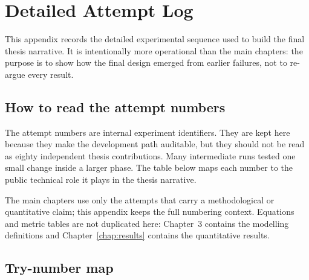 \chapter{Detailed Attempt Log}

This appendix records the detailed experimental sequence used to build the
final thesis narrative. It is intentionally more operational than the main
chapters: the purpose is to show how the final design emerged from earlier
failures, not to re-argue every result.

\section{How to read the attempt numbers}

The attempt numbers are internal experiment identifiers. They are kept here
because they make the development path auditable, but they should not be read
as eighty independent thesis contributions. Many intermediate runs tested one
small change inside a larger phase. The table below maps each number to the
public technical role it plays in the thesis narrative.

The main chapters use only the attempts that carry a methodological or
quantitative claim; this appendix keeps the full numbering context. Equations
and metric tables are not duplicated here: Chapter~3 contains the modelling
definitions and Chapter~\ref{chap:results} contains the quantitative results.

\section{Try-number map}

